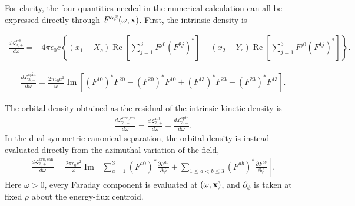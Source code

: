 For clarity, the four quantities needed in the numerical calculation can all
be expressed directly through $F^{\alpha\beta}(\omega,{\bf x})$.  First, the
intrinsic  density is
\begin{highlightbox}[title={Intrinsic angular-momentum density from the Faraday tensor}]
  \begin{align}
    \frac{d\mathcal L^{\mathrm{int}}_{3,+}}{d\omega}
    =-4\pi\epsilon_0c\left\{
      (x_1-X_c)\operatorname{Re}\left[
      \sum_{j=1}^{3}F^{j0}(F^{2j})^*\right]-(x_2-Y_c)\operatorname{Re}\left[
      \sum_{j=1}^{3}F^{j0}(F^{1j})^*\right]
    \right\}.
    \label{eq:one-sided-intrinsic-kinetic-angular-momentum-density-Faraday}
  \end{align}
\end{highlightbox}
\begin{highlightbox}[title={Spin angular-momentum density from the Faraday tensor}]
  \begin{align}
    \frac{d\mathcal L^{\mathrm{spin}}_{3,+}}{d\omega}
    =\frac{2\pi\epsilon_0c^2}{\omega}\operatorname{Im}\left[(F^{10})^*F^{20}-(F^{20})^*F^{10}+(F^{13})^*F^{23}-(F^{23})^*F^{13}
    \right].
    \label{eq:one-sided-spin-angular-momentum-density-Faraday}
  \end{align}
\end{highlightbox}
\begin{highlightbox}[title={Orbital angular-momentum densities from the Faraday tensor}]
  The orbital density obtained as the residual of the intrinsic kinetic
  density is
  \begin{align}
    \frac{d\mathcal L^{\mathrm{orb,res}}_{3,+}}{d\omega}
    =\frac{d\mathcal L^{\mathrm{int}}_{3,+}}{d\omega}
    -\frac{d\mathcal L^{\mathrm{spin}}_{3,+}}{d\omega}.
    \label{eq:one-sided-residual-orbital-angular-momentum-density-Faraday}
  \end{align}
  In the dual-symmetric canonical separation, the orbital density is instead
  evaluated directly from the azimuthal variation of the field,
  \begin{align}
    \frac{d\mathcal L^{\mathrm{orb,can}}_{3,+}}{d\omega}
    =\frac{2\pi\epsilon_0c^2}{\omega}\operatorname{Im}\left[
      \sum_{a=1}^{3}(F^{a0})^*\frac{\partial F^{a0}}{\partial\phi}
      +\sum_{1\leq a<b\leq3}(F^{ab})^*
      \frac{\partial F^{ab}}{\partial\phi}
    \right].
    \label{eq:one-sided-canonical-orbital-angular-momentum-density-Faraday}
  \end{align}
  Here $\omega>0$, every Faraday component is evaluated at
  $(\omega,{\bf x})$, and $\partial_\phi$ is taken at fixed $\rho$ about the
  energy-flux centroid.
\end{highlightbox}

